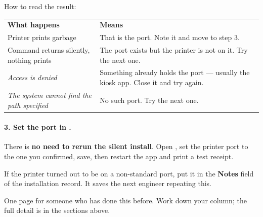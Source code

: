 \documentclass[a4paper,10pt]{article}
\begin{document}
How to read the result:

\begin{center}
\renewcommand{\arraystretch}{1.3}\small
\begin{tabularx}{\textwidth}{L{54mm} X}
\color{white}\textbf{What happens} &
\color{white}\textbf{Means}\\
Printer prints garbage &
That is the port. Note it and move to step 3.\\
Command returns silently, nothing prints &
The port exists but the printer is not on it. Try the next one.\\
\emph{Access is denied} &
Something already holds the port --- usually the kiosk app. Close it and
try again.\\
\emph{The system cannot find the path specified} &
No such port. Try the next one.\\
\end{tabularx}
\end{center}

\paragraph{3. Set the port in .} There is
\textbf{no need to rerun the silent install}. Open
, set the printer port to the one you
confirmed, save, then restart the app and print a test receipt.

\begin{wkinfo}
If the printer turned out to be on a non-standard port, put it in the
\textbf{Notes} field of the installation record. It saves the next
engineer repeating this.
\end{wkinfo}

\clearpage
\appendix
{}

One page for someone who has done this before. Work down your column;
the full detail is in the sections above.
\end{document}

